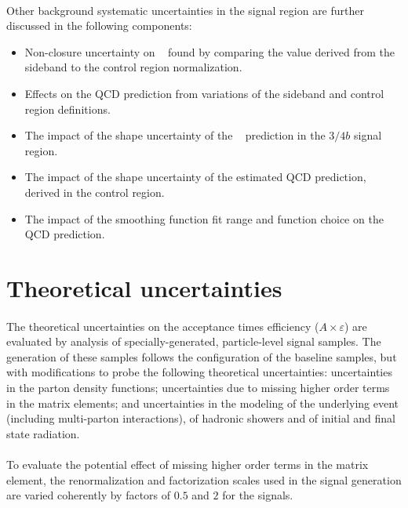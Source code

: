 \paragraph{}
Other background systematic uncertainties in the signal region are further discussed in the following components:
\begin{itemize}
 \item Non-closure uncertainty on \muqcd~ found by comparing the value derived from the sideband to the control region normalization.
 \item Effects on the QCD prediction from variations of the sideband and control region definitions.
 \item The impact of the shape uncertainty of the \ttbar~ prediction in the $3/4b$ signal region.
 \item The impact of the shape uncertainty of the estimated QCD prediction, derived in the control region.
 \item The impact of the smoothing function fit range and function choice on the QCD prediction.
\end{itemize}

\section{Theoretical uncertainties}
\label{sec:boosted-systematics-theory}
\paragraph{}
The theoretical uncertainties on the acceptance times efficiency ($A\times\varepsilon$) are evaluated by analysis of specially-generated, particle-level signal samples. 
The generation of these samples follows the configuration of the baseline samples, but with modifications to probe the following theoretical uncertainties: uncertainties in the parton density functions; uncertainties due to missing higher order terms in the matrix elements; and uncertainties in the modeling of the underlying event (including multi-parton interactions), of hadronic showers and of initial and final state radiation.

\paragraph{}
To evaluate the potential effect of missing higher order terms in the matrix element, the renormalization and factorization scales used in the signal generation are varied coherently by factors of $0.5$ and $2$ for the signals. 

